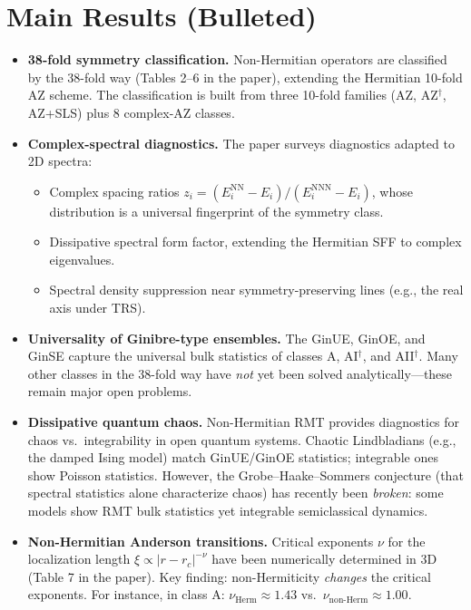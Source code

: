 \documentclass[11pt,a4paper]{article}
\begin{document}
\section{Main Results (Bulleted)}
\begin{itemize}
  \item \textbf{38-fold symmetry classification.}  Non-Hermitian operators are classified by the 38-fold way (Tables 2--6 in the paper), extending the Hermitian 10-fold AZ scheme.  The classification is built from three 10-fold families (AZ, AZ$^\dagger$, AZ+SLS) plus 8 complex-AZ classes.

  \item \textbf{Complex-spectral diagnostics.}  The paper surveys diagnostics adapted to 2D spectra:
    \begin{itemize}[nosep]
      \item Complex spacing ratios $z_i = (E_i^{\mathrm{NN}}-E_i)/(E_i^{\mathrm{NNN}}-E_i)$, whose distribution is a universal fingerprint of the symmetry class.
      \item Dissipative spectral form factor, extending the Hermitian SFF to complex eigenvalues.
      \item Spectral density suppression near symmetry-preserving lines (e.g., the real axis under TRS).
    \end{itemize}

  \item \textbf{Universality of Ginibre-type ensembles.}  The GinUE, GinOE, and GinSE capture the universal bulk statistics of classes A, AI$^\dagger$, and AII$^\dagger$.  Many other classes in the 38-fold way have \emph{not} yet been solved analytically---these remain major open problems.

  \item \textbf{Dissipative quantum chaos.}  Non-Hermitian RMT provides diagnostics for chaos vs.\ integrability in open quantum systems.  Chaotic Lindbladians (e.g., the damped Ising model) match GinUE/GinOE statistics; integrable ones show Poisson statistics.  However, the Grobe--Haake--Sommers conjecture (that spectral statistics alone characterize chaos) has recently been \emph{broken}: some models show RMT bulk statistics yet integrable semiclassical dynamics.

  \item \textbf{Non-Hermitian Anderson transitions.}  Critical exponents $\nu$ for the localization length $\xi\propto|r-r_c|^{-\nu}$ have been numerically determined in 3D (Table 7 in the paper).  Key finding: non-Hermiticity \emph{changes} the critical exponents.  For instance, in class A: $\nu_{\mathrm{Herm}}\approx 1.43$ vs.\ $\nu_{\mathrm{non\text{-}Herm}}\approx 1.00$.


\end{itemize}
\end{document}
